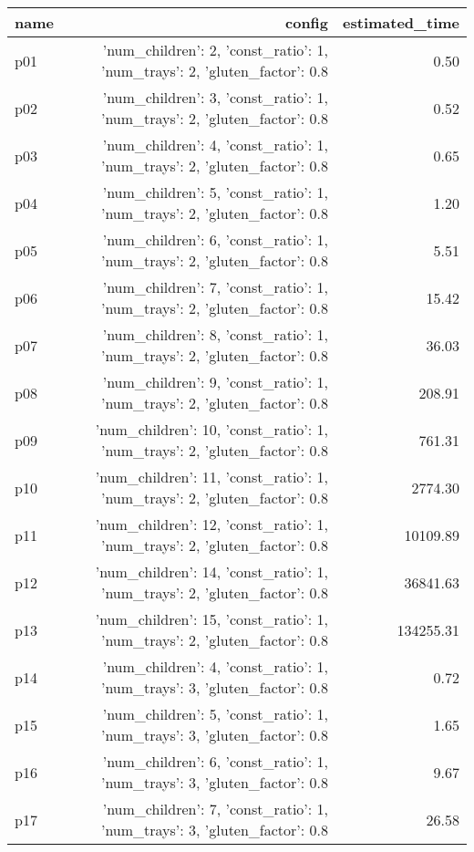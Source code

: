 \documentclass{article}
\begin{document}
                            \begin{center}
                            \scriptsize
                            \begin{tabular}{@{}l|r|r@{}}
                            name & config & estimated\_time\\\midrule
                              p01&{'num\_children': 2, 'const\_ratio': 1, 'num\_trays': 2, 'gluten\_factor': 0.8}&0.50\\
  p02&{'num\_children': 3, 'const\_ratio': 1, 'num\_trays': 2, 'gluten\_factor': 0.8}&0.52\\
  p03&{'num\_children': 4, 'const\_ratio': 1, 'num\_trays': 2, 'gluten\_factor': 0.8}&0.65\\
  p04&{'num\_children': 5, 'const\_ratio': 1, 'num\_trays': 2, 'gluten\_factor': 0.8}&1.20\\
  p05&{'num\_children': 6, 'const\_ratio': 1, 'num\_trays': 2, 'gluten\_factor': 0.8}&5.51\\
  p06&{'num\_children': 7, 'const\_ratio': 1, 'num\_trays': 2, 'gluten\_factor': 0.8}&15.42\\
  p07&{'num\_children': 8, 'const\_ratio': 1, 'num\_trays': 2, 'gluten\_factor': 0.8}&36.03\\
  p08&{'num\_children': 9, 'const\_ratio': 1, 'num\_trays': 2, 'gluten\_factor': 0.8}&208.91\\
  p09&{'num\_children': 10, 'const\_ratio': 1, 'num\_trays': 2, 'gluten\_factor': 0.8}&761.31\\
  p10&{'num\_children': 11, 'const\_ratio': 1, 'num\_trays': 2, 'gluten\_factor': 0.8}&2774.30\\
  p11&{'num\_children': 12, 'const\_ratio': 1, 'num\_trays': 2, 'gluten\_factor': 0.8}&10109.89\\
  p12&{'num\_children': 14, 'const\_ratio': 1, 'num\_trays': 2, 'gluten\_factor': 0.8}&36841.63\\
  p13&{'num\_children': 15, 'const\_ratio': 1, 'num\_trays': 2, 'gluten\_factor': 0.8}&134255.31\\
  p14&{'num\_children': 4, 'const\_ratio': 1, 'num\_trays': 3, 'gluten\_factor': 0.8}&0.72\\
  p15&{'num\_children': 5, 'const\_ratio': 1, 'num\_trays': 3, 'gluten\_factor': 0.8}&1.65\\
  p16&{'num\_children': 6, 'const\_ratio': 1, 'num\_trays': 3, 'gluten\_factor': 0.8}&9.67\\
  p17&{'num\_children': 7, 'const\_ratio': 1, 'num\_trays': 3, 'gluten\_factor': 0.8}&26.58\\

\end{tabular}
\end{center}
\end{document}
